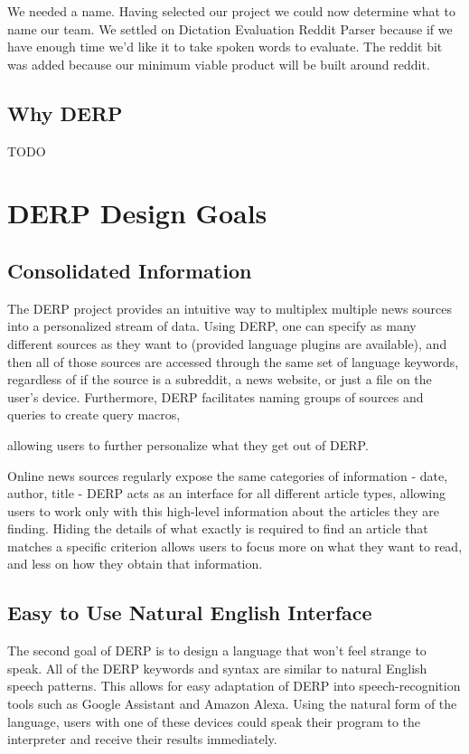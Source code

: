 \documentclass{article}
\begin{document}
We needed a name. Having selected our project we could now determine what to name our team. We settled on Dictation Evaluation Reddit Parser because if we have enough time we'd like it to take spoken words to evaluate. The reddit bit was added because our minimum viable product will be built around reddit.


\subsection{Why DERP}
TODO %

\newpage
\section{DERP Design Goals}
\subsection{Consolidated Information}
The DERP project provides an intuitive way to multiplex multiple news sources into a personalized stream of data. Using DERP, one can specify as many different sources as they want to (provided language plugins are available), and then all of those sources are accessed through the same set of language keywords, regardless of if the source is a subreddit, a news website, or just a file on the user's device. Furthermore, DERP facilitates naming groups of sources and queries to create query macros,
\begin{comment}
@ADS Did we actually decide on if we want savable sets of instructions other than in the form of a DERP program? (Can a program create another program?)
\end{comment}
allowing users to further personalize what they get out of DERP.

Online news sources regularly expose the same categories of information - date, author, title - DERP acts as an interface for all different article types, allowing users to work only with this high-level information about the articles they are finding. Hiding the details of what exactly is required to find an article that matches a specific criterion allows users to focus more on what they want to read, and less on how they obtain that information.

\subsection{Easy to Use Natural English Interface}
The second goal of DERP is to design a language that won't feel strange to speak. All of the DERP keywords and syntax are similar to natural English speech patterns. This allows for easy adaptation of DERP into speech-recognition tools such as Google Assistant and Amazon Alexa. Using the natural form of the language, users with one of these devices could speak their program to the interpreter and receive their results immediately.
\end{document}
